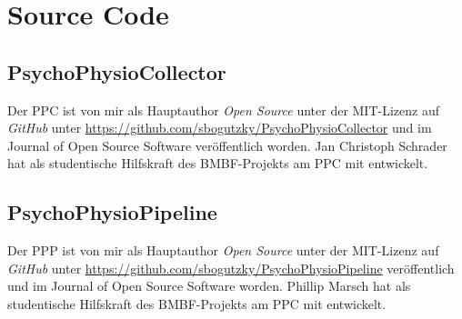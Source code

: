 \chapter{Source Code}
\section{PsychoPhysioCollector}
Der \ac{PPC} ist von mir als Hauptauthor \emph{Open Source} unter der MIT-Lizenz auf \emph{GitHub} unter \url{https://github.com/sbogutzky/PsychoPhysioCollector} und im Journal of Open Source Software \citep{Bogutzky2016} veröffentlich worden. Jan Christoph Schrader hat als studentische Hilfskraft des \acs{BMBF}-Projekts am \ac{PPC} mit entwickelt. 

\section{PsychoPhysioPipeline}
Der \ac{PPP} ist von mir als Hauptauthor \emph{Open Source} unter der MIT-Lizenz auf \emph{GitHub} unter \url{https://github.com/sbogutzky/PsychoPhysioPipeline} veröffentlich und im Journal of Open Source Software \citep{Bogutzky2016a} worden. Phillip Marsch hat als studentische Hilfskraft des \acs{BMBF}-Projekts am \ac{PPC} mit entwickelt. 